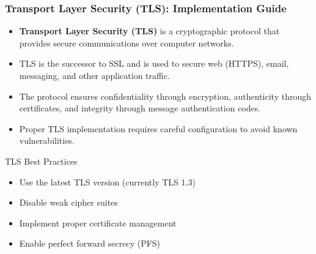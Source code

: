 \documentclass{beamer}
\begin{document}
\begin{frame}
    \frametitle{Transport Layer Security (TLS): Implementation Guide}
    \begin{itemize}
        \item \textbf{Transport Layer Security (TLS)} is a cryptographic protocol that provides secure communications over computer networks.
        \item TLS is the successor to SSL and is used to secure web (HTTPS), email, messaging, and other application traffic.
        \item The protocol ensures confidentiality through encryption, authenticity through certificates, and integrity through message authentication codes.
        \item Proper TLS implementation requires careful configuration to avoid known vulnerabilities.
    \end{itemize}
    
    \begin{exampleblock}{TLS Best Practices}
        \begin{itemize}
            \item Use the latest TLS version (currently TLS 1.3)
            \item Disable weak cipher suites
            \item Implement proper certificate management
            \item Enable perfect forward secrecy (PFS)
        \end{itemize}
    \end{exampleblock}
\end{frame}
\end{document}
